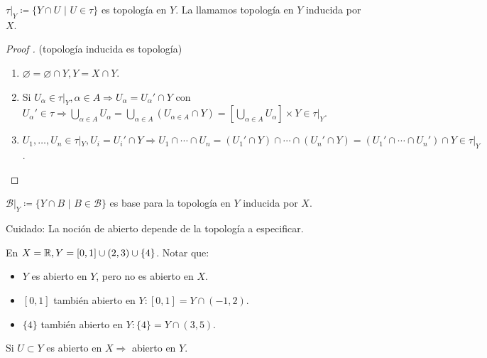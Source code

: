 \documentclass[a4paper]{report}
\begin{document}
	\begin{definition}
		$\tau|_Y \coloneq \{ Y \cap U \text{ | } U \in \tau \}$ es topología en $Y$. La llamamos topología en $Y$ inducida por $X$.  
	\end{definition}

	\begin{proof}[Proof ] (topología inducida es topología)
		\begin{enumerate}
			\item $\varnothing = \varnothing \cap Y, Y = X \cap Y$.

			\item Si $U_{\alpha} \in \tau|_Y, \alpha \in A \Rightarrow U_{\alpha} = U_{\alpha}' \cap Y$ con $U_{\alpha}' \in \tau \Rightarrow \bigcup_{\alpha \in A} U_{\alpha} = \bigcup_{\alpha \in A} (U_{\alpha \in A} \cap Y) = \left[ \bigcup_{\alpha \in A} U_{\alpha} \right] \times Y \in \tau|_Y$.

			\item $U_1,\dots,U_n \in \tau|_Y, U_i = U_i' \cap Y \Rightarrow U_1 \cap \cdots \cap U_n = (U_1' \cap Y) \cap \cdots \cap (U_n' \cap Y) = (U_1' \cap \cdots \cap U_n') \cap Y \in \tau|_Y$.
		\end{enumerate}
	\end{proof}

	\begin{lemma}
		$\mathcal{B}|_Y \coloneq \{ Y \cap B \text{ | } B \in \mathcal{B} \}$ es base para la topología en $Y$ inducida por $X$.  
	\end{lemma}

	\begin{remark}
		Cuidado: La noción de abierto depende de la topología a especificar.
	\end{remark}

	\begin{eg}
		En $X = \mathbb{R}, Y = [0,1] \cup (2,3) \cup \{ 4 \}$. Notar que:
		\begin{itemize}
			\item $Y$ es abierto en $Y$, pero no es abierto en $X$.

			\item $[0,1]$ también abierto en $Y : [0,1] = Y \cap (-1,2)$.

			\item $\{ 4 \}$ también abierto en $Y : \{ 4 \} = Y \cap (3,5)$.
		\end{itemize}
	\end{eg}

	\begin{note}
		Si $U \subset Y$ es abierto en $X \Rightarrow$ abierto en $Y$.
	\end{note}
\end{document}
